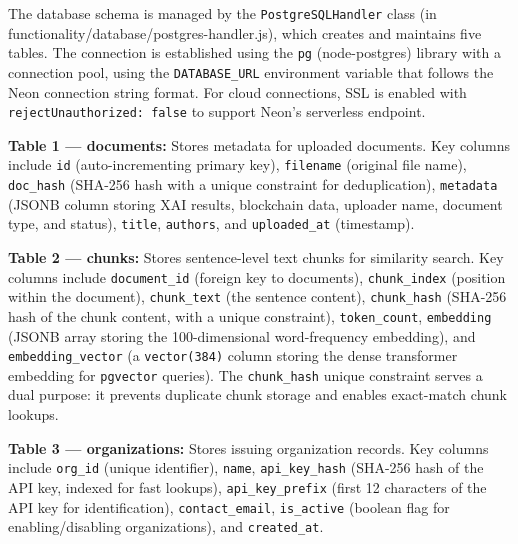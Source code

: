 The database schema is managed by the \texttt{PostgreSQLHandler} class (in {functionality/database/postgres-handler.js}), which creates and maintains five tables. The connection is established using the \texttt{pg} (node-postgres) library with a connection pool, using the \texttt{DATABASE\_URL} environment variable that follows the Neon connection string format. For cloud connections, SSL is enabled with \texttt{rejectUnauthorized: false} to support Neon's serverless endpoint.

\textbf{Table 1 --- documents:} Stores metadata for uploaded documents. Key columns include \texttt{id} (auto-incrementing primary key), \texttt{filename} (original file name), \texttt{doc\_hash} (SHA-256 hash with a unique constraint for deduplication), \texttt{metadata} (JSONB column storing XAI results, blockchain data, uploader name, document type, and status), \texttt{title}, \texttt{authors}, and \texttt{uploaded\_at} (timestamp).

\textbf{Table 2 --- chunks:} Stores sentence-level text chunks for similarity search. Key columns include \texttt{document\_id} (foreign key to documents), \texttt{chunk\_index} (position within the document), \texttt{chunk\_text} (the sentence content), \texttt{chunk\_hash} (SHA-256 hash of the chunk content, with a unique constraint), \texttt{token\_count}, \texttt{embedding} (JSONB array storing the 100-dimensional word-frequency embedding), and \texttt{embedding\_vector} (a \texttt{vector(384)} column storing the dense transformer embedding for \texttt{pgvector} queries). The \texttt{chunk\_hash} unique constraint serves a dual purpose: it prevents duplicate chunk storage and enables exact-match chunk lookups.

\textbf{Table 3 --- organizations:} Stores issuing organization records. Key columns include \texttt{org\_id} (unique identifier), \texttt{name}, \texttt{api\_key\_hash} (SHA-256 hash of the API key, indexed for fast lookups), \texttt{api\_key\_prefix} (first 12 characters of the API key for identification), \texttt{contact\_email}, \texttt{is\_active} (boolean flag for enabling/disabling organizations), and \texttt{created\_at}.

